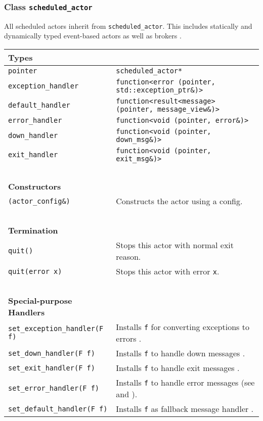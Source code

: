 \clearpage
\subsubsection{Class \lstinline^scheduled_actor^}

All scheduled actors inherit from \lstinline^scheduled_actor^. This includes
statically and dynamically typed event-based actors as well as brokers
.

\begin{center}
\begin{tabular}{ll}
  \textbf{Types} & ~ \\
  \hline
  \lstinline^pointer^ & \lstinline^scheduled_actor*^ \\
  \hline
  \lstinline^exception_handler^ & \lstinline^function<error (pointer, std::exception_ptr&)>^ \\
  \hline
  \lstinline^default_handler^ & \lstinline^function<result<message> (pointer, message_view&)>^ \\
  \hline
  \lstinline^error_handler^ & \lstinline^function<void (pointer, error&)>^ \\
  \hline
  \lstinline^down_handler^ & \lstinline^function<void (pointer, down_msg&)>^ \\
  \hline
  \lstinline^exit_handler^ & \lstinline^function<void (pointer, exit_msg&)>^ \\
  \hline
  ~ & ~ \\ \textbf{Constructors} & ~ \\
  \hline
  \lstinline^(actor_config&)^ & Constructs the actor using a config. \\
  \hline
  ~ & ~ \\ \textbf{Termination} & ~ \\
  \hline
  \lstinline^quit()^ & Stops this actor with normal exit reason. \\
  \hline
  \lstinline^quit(error x)^ & Stops this actor with error \lstinline^x^. \\
  \hline
  ~ & ~ \\ \textbf{Special-purpose Handlers} & ~ \\
  \hline
  \lstinline^set_exception_handler(F f)^ & Installs \lstinline^f^ for converting exceptions to errors . \\
  \hline
  \lstinline^set_down_handler(F f)^ & Installs \lstinline^f^ to handle down messages . \\
  \hline
  \lstinline^set_exit_handler(F f)^ & Installs \lstinline^f^ to handle exit messages . \\
  \hline
  \lstinline^set_error_handler(F f)^ & Installs \lstinline^f^ to handle error messages (see  and ). \\
  \hline
  \lstinline^set_default_handler(F f)^ & Installs \lstinline^f^ as fallback message handler . \\
  \hline
\end{tabular}
\end{center}

